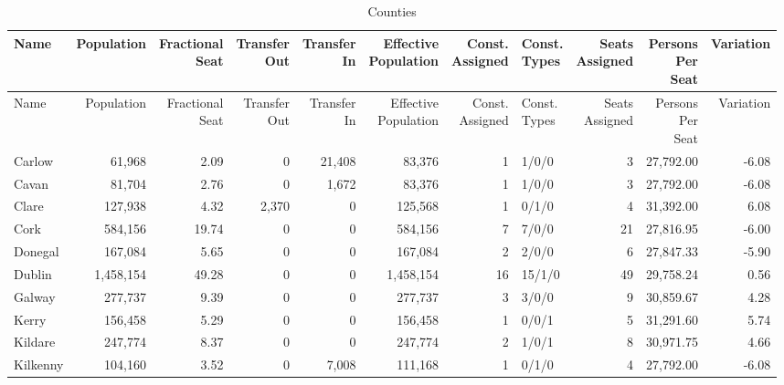\documentclass[a4paper]{article}
\begin{document}
\begin{longtable}{lrrrrrrlrrr}
\caption{Counties}
\\ \toprule
Name &Population &\shortstack{Fractional\\Seat} &\shortstack{Transfer\\Out} &\shortstack{Transfer\\In} &\shortstack{Effective\\Population} &\shortstack{Const.\\Assigned} &\shortstack{Const.\\Types} &\shortstack{Seats\\Assigned} &\shortstack{Persons\\Per\\Seat} &Variation \\ \midrule
\endfirsthead
\toprule
Name &Population &\shortstack{Fractional\\Seat} &\shortstack{Transfer\\Out} &\shortstack{Transfer\\In} &\shortstack{Effective\\Population} &\shortstack{Const.\\Assigned} &\shortstack{Const.\\Types} &\shortstack{Seats\\Assigned} &\shortstack{Persons\\Per\\Seat} &Variation \\ \midrule
\endhead
\bottomrule
\endfoot
Carlow&61,968& 2.09&0&21,408&83,376&1&1/0/0&3&27,792.00&-6.08\\ 
Cavan&81,704& 2.76&0&1,672&83,376&1&1/0/0&3&27,792.00&-6.08\\ 
Clare&127,938& 4.32&2,370&0&125,568&1&0/1/0&4&31,392.00& 6.08\\ 
Cork&584,156&19.74&0&0&584,156&7&7/0/0&21&27,816.95&-6.00\\ 
Donegal&167,084& 5.65&0&0&167,084&2&2/0/0&6&27,847.33&-5.90\\ 
Dublin&1,458,154&49.28&0&0&1,458,154&16&15/1/0&49&29,758.24& 0.56\\ 
Galway&277,737& 9.39&0&0&277,737&3&3/0/0&9&30,859.67& 4.28\\ 
Kerry&156,458& 5.29&0&0&156,458&1&0/0/1&5&31,291.60& 5.74\\ 
Kildare&247,774& 8.37&0&0&247,774&2&1/0/1&8&30,971.75& 4.66\\ 
Kilkenny&104,160& 3.52&0&7,008&111,168&1&0/1/0&4&27,792.00&-6.08\\ 

\end{longtable}
\end{document}
